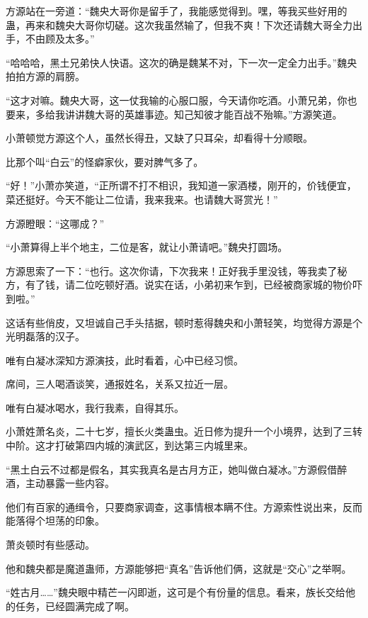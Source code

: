 \begin{this_body}
方源站在一旁道：“魏央大哥你是留手了，我能感觉得到。嘿，等我买些好用的蛊，再来和魏央大哥你切磋。这次我虽然输了，但我不爽！下次还请魏大哥全力出手，不由顾及太多。”

“哈哈哈，黑土兄弟快人快语。这次的确是魏某不对，下一次一定全力出手。”魏央拍拍方源的肩膀。

“这才对嘛。魏央大哥，这一仗我输的心服口服，今天请你吃酒。小萧兄弟，你也要来，多给我讲讲魏大哥的英雄事迹。知己知彼才能百战不殆嘛。”方源笑道。

小萧顿觉方源这个人，虽然长得丑，又缺了只耳朵，却看得十分顺眼。

比那个叫“白云”的怪癖家伙，要对脾气多了。

“好！”小萧亦笑道，“正所谓不打不相识，我知道一家酒楼，刚开的，价钱便宜，菜还挺好。今天不能让二位请，我来我来。也请魏大哥赏光！”

方源瞪眼：“这哪成？”

“小萧算得上半个地主，二位是客，就让小萧请吧。”魏央打圆场。

方源思索了一下：“也行。这次你请，下次我来！正好我手里没钱，等我卖了秘方，有了钱，请二位吃顿好酒。说实在话，小弟初来乍到，已经被商家城的物价吓到啦。”

这话有些俏皮，又坦诚自己手头拮据，顿时惹得魏央和小萧轻笑，均觉得方源是个光明磊落的汉子。

唯有白凝冰深知方源演技，此时看着，心中已经习惯。

席间，三人喝酒谈笑，通报姓名，关系又拉近一层。

唯有白凝冰喝水，我行我素，自得其乐。

小萧姓萧名炎，二十七岁，擅长火类蛊虫。近日修为提升一个小境界，达到了三转中阶。这才打破第四内城的演武区，到达第三内城里来。

“黑土白云不过都是假名，其实我真名是古月方正，她叫做白凝冰。”方源假借醉酒，主动暴露一些内容。

他们有百家的通缉令，只要商家调查，这事情根本瞒不住。方源索性说出来，反而能落得个坦荡的印象。

萧炎顿时有些感动。

他和魏央都是魔道蛊师，方源能够把“真名”告诉他们俩，这就是“交心”之举啊。

“姓古月……”魏央眼中精芒一闪即逝，这可是个有份量的信息。看来，族长交给他的任务，已经圆满完成了啊。

\end{this_body}

